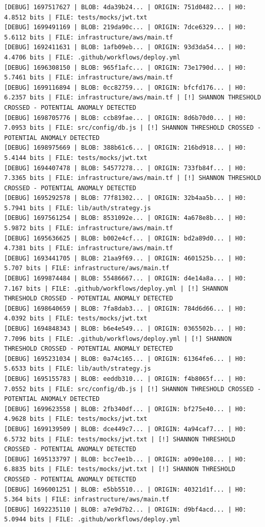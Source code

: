 \documentclass[12pt, a4paper, oneside]{report}
\begin{document}
\begin{lstlisting}[basicstyle=\tiny\ttfamily]
[DEBUG] 1697517627 | BLOB: 4da39b24... | ORIGIN: 751d0482... | H0: 4.8512 bits | FILE: tests/mocks/jwt.txt
[DEBUG] 1699491169 | BLOB: 219da90c... | ORIGIN: 7dce6329... | H0: 5.6112 bits | FILE: infrastructure/aws/main.tf
[DEBUG] 1692411631 | BLOB: 1afb09eb... | ORIGIN: 93d3da54... | H0: 4.4706 bits | FILE: .github/workflows/deploy.yml
[DEBUG] 1696308150 | BLOB: 965f1afc... | ORIGIN: 73e1790d... | H0: 5.7461 bits | FILE: infrastructure/aws/main.tf
[DEBUG] 1699116894 | BLOB: 0cc82759... | ORIGIN: bfcfd176... | H0: 6.2357 bits | FILE: infrastructure/aws/main.tf | [!] SHANNON THRESHOLD CROSSED - POTENTIAL ANOMALY DETECTED
[DEBUG] 1698705776 | BLOB: ccb89fae... | ORIGIN: 8d6b70d0... | H0: 7.0953 bits | FILE: src/config/db.js | [!] SHANNON THRESHOLD CROSSED - POTENTIAL ANOMALY DETECTED
[DEBUG] 1698975669 | BLOB: 388b61c6... | ORIGIN: 216bd918... | H0: 5.4144 bits | FILE: tests/mocks/jwt.txt
[DEBUG] 1694407478 | BLOB: 54577278... | ORIGIN: 733fb84f... | H0: 7.3365 bits | FILE: infrastructure/aws/main.tf | [!] SHANNON THRESHOLD CROSSED - POTENTIAL ANOMALY DETECTED
[DEBUG] 1695292578 | BLOB: 77f81302... | ORIGIN: 32b4aa5b... | H0: 5.7941 bits | FILE: lib/auth/strategy.js
[DEBUG] 1697561254 | BLOB: 8531092e... | ORIGIN: 4a678e8b... | H0: 5.9872 bits | FILE: infrastructure/aws/main.tf
[DEBUG] 1695636625 | BLOB: b002e4cf... | ORIGIN: bd2a89d0... | H0: 4.7381 bits | FILE: infrastructure/aws/main.tf
[DEBUG] 1693441705 | BLOB: 21aa9f69... | ORIGIN: 4601525b... | H0: 5.707 bits | FILE: infrastructure/aws/main.tf
[DEBUG] 1699874484 | BLOB: 55486667... | ORIGIN: d4e14a8a... | H0: 7.167 bits | FILE: .github/workflows/deploy.yml | [!] SHANNON THRESHOLD CROSSED - POTENTIAL ANOMALY DETECTED
[DEBUG] 1698640659 | BLOB: 7fa8dab3... | ORIGIN: 784d6d66... | H0: 4.0392 bits | FILE: tests/mocks/jwt.txt
[DEBUG] 1694848343 | BLOB: b6e4e549... | ORIGIN: 0365502b... | H0: 7.7096 bits | FILE: .github/workflows/deploy.yml | [!] SHANNON THRESHOLD CROSSED - POTENTIAL ANOMALY DETECTED
[DEBUG] 1695231034 | BLOB: 0a74c165... | ORIGIN: 61364fe6... | H0: 5.6533 bits | FILE: lib/auth/strategy.js
[DEBUG] 1695155783 | BLOB: eeddb310... | ORIGIN: f4b8065f... | H0: 7.0552 bits | FILE: src/config/db.js | [!] SHANNON THRESHOLD CROSSED - POTENTIAL ANOMALY DETECTED
[DEBUG] 1699623558 | BLOB: 2fb340df... | ORIGIN: bf275e40... | H0: 4.9628 bits | FILE: tests/mocks/jwt.txt
[DEBUG] 1699139509 | BLOB: dce449c7... | ORIGIN: 4a94caf7... | H0: 6.5732 bits | FILE: tests/mocks/jwt.txt | [!] SHANNON THRESHOLD CROSSED - POTENTIAL ANOMALY DETECTED
[DEBUG] 1695133797 | BLOB: bcc7ee1b... | ORIGIN: a090e108... | H0: 6.8835 bits | FILE: tests/mocks/jwt.txt | [!] SHANNON THRESHOLD CROSSED - POTENTIAL ANOMALY DETECTED
[DEBUG] 1696001251 | BLOB: e5bb5510... | ORIGIN: 40321d1f... | H0: 5.364 bits | FILE: infrastructure/aws/main.tf
[DEBUG] 1692235110 | BLOB: a7e9d7b2... | ORIGIN: d9bf4acd... | H0: 5.0944 bits | FILE: .github/workflows/deploy.yml
\end{lstlisting}
\end{document}
